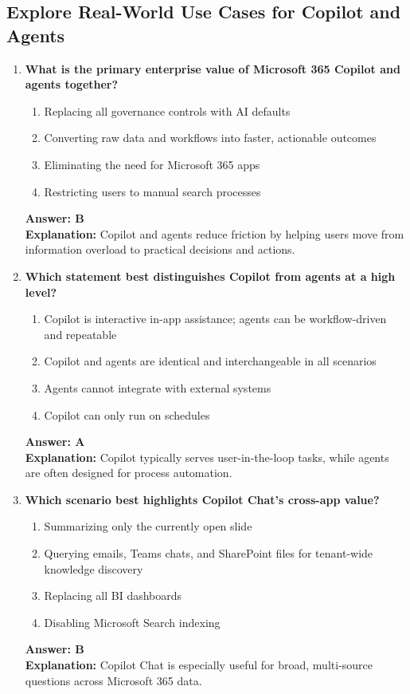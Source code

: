 \documentclass[10pt]{article}
\begin{document}
\subsection{Explore Real-World Use Cases for Copilot and Agents}
\begin{enumerate}[leftmargin=*]

\item \textbf{What is the primary enterprise value of Microsoft 365 Copilot and agents together?}
\begin{enumerate}[label=\Alph*.]
  \item Replacing all governance controls with AI defaults
  \item Converting raw data and workflows into faster, actionable outcomes
  \item Eliminating the need for Microsoft 365 apps
  \item Restricting users to manual search processes
\end{enumerate}
\textbf{Answer: B}\\
\textbf{Explanation:} Copilot and agents reduce friction by helping users move from information overload to practical decisions and actions.

\item \textbf{Which statement best distinguishes Copilot from agents at a high level?}
\begin{enumerate}[label=\Alph*.]
  \item Copilot is interactive in-app assistance; agents can be workflow-driven and repeatable
  \item Copilot and agents are identical and interchangeable in all scenarios
  \item Agents cannot integrate with external systems
  \item Copilot can only run on schedules
\end{enumerate}
\textbf{Answer: A}\\
\textbf{Explanation:} Copilot typically serves user-in-the-loop tasks, while agents are often designed for process automation.

\item \textbf{Which scenario best highlights Copilot Chat’s cross-app value?}
\begin{enumerate}[label=\Alph*.]
  \item Summarizing only the currently open slide
  \item Querying emails, Teams chats, and SharePoint files for tenant-wide knowledge discovery
  \item Replacing all BI dashboards
  \item Disabling Microsoft Search indexing
\end{enumerate}
\textbf{Answer: B}\\
\textbf{Explanation:} Copilot Chat is especially useful for broad, multi-source questions across Microsoft 365 data.


\end{enumerate}
\end{document}
